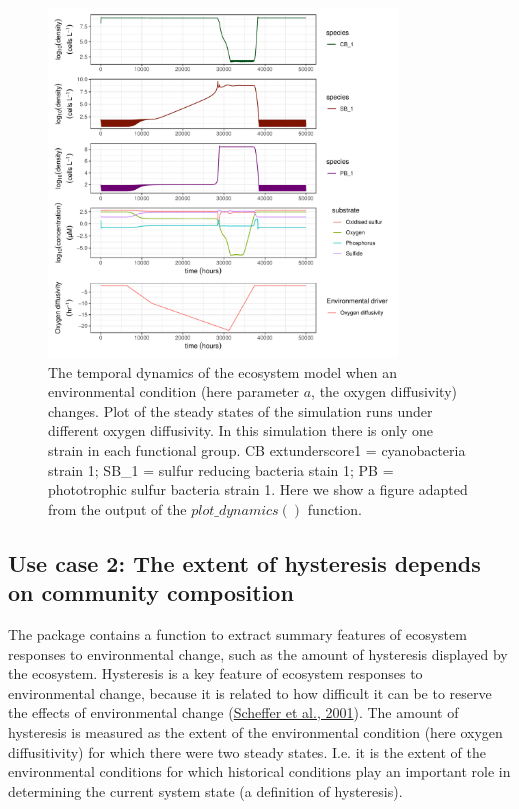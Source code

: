 \documentclass[
]{article}
\begin{document}
\begin{figure}

{\centering \includegraphics[width=350px]{figures/gen_uc1_partrep_temporal_state_switching} 

}

\caption{The temporal dynamics of the ecosystem model when an environmental condition (here parameter $a$, the oxygen diffusivity) changes. Plot of the steady states of the simulation runs under different oxygen diffusivity. In this simulation there is only one strain in each functional group. CB   extunderscore1 = cyanobacteria strain 1; SB\_1 = sulfur reducing bacteria stain 1; PB = phototrophic sulfur bacteria strain 1. Here we show a figure adapted from the output of the $plot\_dynamics()$  function.}\label{fig:uc1}
\end{figure}

\hypertarget{use-case-2-the-extent-of-hysteresis-depends-on-community-composition}{%
\subsection{Use case 2: The extent of hysteresis depends on community
composition}\label{use-case-2-the-extent-of-hysteresis-depends-on-community-composition}}

The package contains a function to extract summary features of ecosystem
responses to environmental change, such as the amount of hysteresis
displayed by the ecosystem. Hysteresis is a key feature of ecosystem
responses to environmental change, because it is related to how
difficult it can be to reserve the effects of environmental change
(\protect\hyperlink{ref-Scheffer2001}{Scheffer et al., 2001}). The
amount of hysteresis is measured as the extent of the environmental
condition (here oxygen diffusitivity) for which there were two steady
states. I.e. it is the extent of the environmental conditions for which
historical conditions play an important role in determining the current
system state (a definition of hysteresis).
\end{document}

